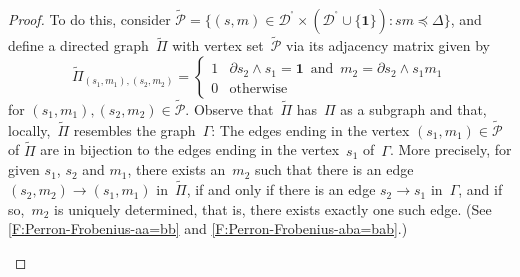 \documentclass[a4paper,final]{article}
\theoremstyle{plain}
\theoremstyle{remark}
\theoremstyle{definition}
\begin{document}
\begin{proof}
To do this, consider
$\widetilde{\mathcal{P}} = \{(s,m)\in{{\mathcal{D}}^{\!{}^{\circ}\!}}\times({{\mathcal{D}}^{\!{}^{\circ}\!}}\cup\{{\mathbf{1}}\}) : sm\preccurlyeq\Delta\}$,
and define a directed graph~$\widetilde{\Pi}$ with vertex set~$\widetilde{\mathcal{P}}$
via its adjacency matrix given by
\[
 \widetilde{\Pi}_{(s_1,m_1),(s_2,m_2)} = \begin{cases}
                         1 & \partial s_2\wedge s_1 = {\mathbf{1}} \,\text{ and }\, m_2 = \partial s_2\wedge s_1m_1 \\
                         0 & \text{otherwise}
                       \end{cases}
\]
for $(s_1,m_1),(s_2,m_2)\in\widetilde{\mathcal{P}}$.
Observe that~$\widetilde{\Pi}$ has~${\Pi}$ as a subgraph and that, locally,~$\widetilde{\Pi}$ resembles the graph~${\Gamma}$:
The edges ending in the vertex $(s_1,m_1)\in\widetilde{\mathcal{P}}$ of $\widetilde{\Pi}$ are in bijection to the edges ending in the vertex~$s_1$ of~${\Gamma}$.  More precisely, for given $s_1$, $s_2$ and $m_1$, there exists an~$m_2$ such that there is an edge $(s_2,m_2) \to (s_1,m_1)$ in~$\widetilde{\Pi}$, if and only if there is an edge $s_2 \to s_1$ in~${\Gamma}$, and if so,~$m_2$ is uniquely determined, that is, there exists exactly one such edge.
(See \autoref{F:Perron-Frobenius-aa=bb} and \autoref{F:Perron-Frobenius-aba=bab}.)

\begin{figure}
  \hfill
  \parbox[b]{0.3\textwidth}{
  } \hfill
  \parbox[b]{0.3\textwidth}{
  } \hfill
  \parbox[b]{0.3\textwidth}{    
    }
\end{figure}
\end{proof}
\end{document}
